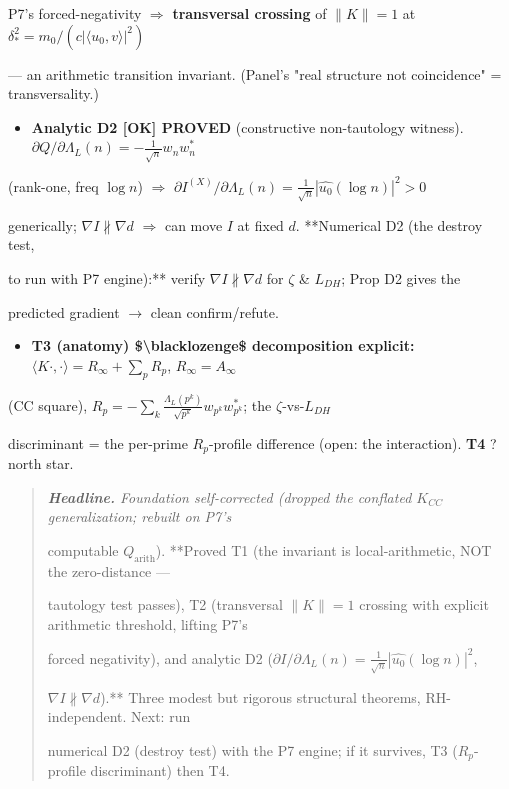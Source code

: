\documentclass[10pt]{article}
\begin{document}
  P7's forced-negativity \ensuremath{\Rightarrow} \textbf{transversal crossing} of $\|K\|=1$ at $\delta_*^2=m_0/(c|\langle u_0,v\rangle|^2)$\par
  --- an arithmetic transition invariant. (Panel's "real structure not coincidence" = transversality.)\par
\begin{itemize}
\item \textbf{Analytic D2 [OK] PROVED} (constructive non-tautology witness). $\partial Q/\partial\Lambda_L(n)=-\tfrac1{\sqrt n}w_nw_n^*$
\end{itemize}
  (rank-one, freq $\log n$) \ensuremath{\Rightarrow} $\partial I^{(X)}/\partial\Lambda_L(n)=\tfrac1{\sqrt n}|\widehat{u_0}(\log n)|^2>0$\par
  generically; $\nabla I\not\parallel\nabla d$ \ensuremath{\Rightarrow} can move $I$ at fixed $d$. **Numerical D2 (the destroy test,\par
  to run with P7 engine):** verify $\nabla I\not\parallel\nabla d$ for $\zeta$ \& $L_{DH}$; Prop D2 gives the\par
  predicted gradient \ensuremath{\to} clean confirm/refute.\par
\begin{itemize}
\item \textbf{T3 (anatomy) \$\textbackslash{}blacklozenge\$ decomposition explicit:} $\langle K\cdot,\cdot\rangle=R_\infty+\sum_p R_p$, $R_\infty=A_\infty$
\end{itemize}
  (CC square), $R_p=-\sum_k\tfrac{\Lambda_L(p^k)}{\sqrt{p^k}}w_{p^k}w_{p^k}^*$; the $\zeta$-vs-$L_{DH}$\par
  discriminant = the per-prime $R_p$-profile difference (open: the interaction). \textbf{T4} ? north star.\par

\begin{quote}\itshape
\textbf{Headline.} Foundation self-corrected (dropped the conflated $K_{CC}$ generalization; rebuilt on P7's\par
computable $Q_{\mathrm{arith}}$). **Proved T1 (the invariant is local-arithmetic, NOT the zero-distance ---\par
tautology test passes), T2 (transversal $\|K\|=1$ crossing with explicit arithmetic threshold, lifting P7's\par
forced negativity), and analytic D2 ($\partial I/\partial\Lambda_L(n)=\tfrac1{\sqrt n}|\widehat{u_0}(\log n)|^2$,\par
$\nabla I\not\parallel\nabla d$).** Three modest but rigorous structural theorems, RH-independent. Next: run\par
numerical D2 (destroy test) with the P7 engine; if it survives, T3 ($R_p$-profile discriminant) then T4.\par
\end{quote}
\end{document}
